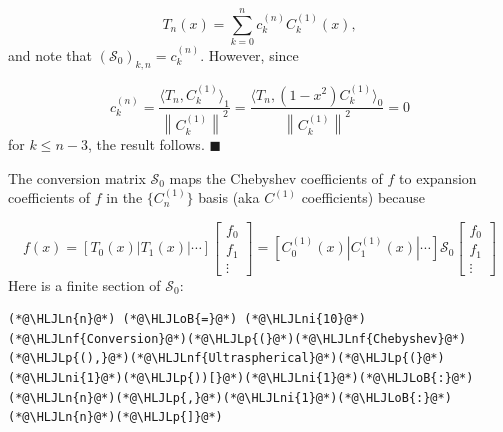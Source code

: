 \documentclass[12pt,a4paper]{article}
\newcommand{\HLJLn}[1]{#1}
\newcommand{\HLJLnf}[1]{\textcolor[RGB]{66,102,213}{#1}}
\newcommand{\HLJLni}[1]{\textcolor[RGB]{59,151,46}{#1}}
\newcommand{\HLJLoB}[1]{\textcolor[RGB]{102,102,102}{\textbf{#1}}}
\newcommand{\HLJLp}[1]{#1}
\begin{document}
\[
T_n(x) = \sum_{k=0}^{n} c_k^{(n)} C_k^{(1)}(x),
\]
and note that $\left(\mathcal{S}_0\right)_{k,n} = c_k^{(n)}$. However, since

\[
c_k^{(n)} = \frac{\langle  T_n,  C^{(1)}_k \rangle_{1}}{\left\| C^{(1)}_k \right\|^2} = \frac{\langle  T_n,  (1-x^2)C^{(1)}_k \rangle_{0}}{\left\| C^{(1)}_k \right\|^2} = 0
\]
for $k \leq n-3$, the result follows.  $\blacksquare$

The conversion matrix $\mathcal{S}_0$ maps the Chebyshev coefficients of $f$ to expansion coefficients of $f$ in the $\{C_n^{(1)}\}$ basis (aka $C^{(1)}$ coefficients) because

\[
f(x) = \left[ T_0(x) | T_1(x) | \cdots  \right]
\begin{bmatrix}
f_0 \\
f_1 \\
\vdots
\end{bmatrix}  =  \left[ C^{(1)}_0(x) | C^{(1)}_1(x) | \cdots  \right]\mathcal{S}_0\begin{bmatrix}
f_0 \\
f_1 \\
\vdots
\end{bmatrix}
\]
Here is a finite section of $\mathcal{S}_0$:


\begin{lstlisting}
(*@\HLJLn{n}@*) (*@\HLJLoB{=}@*) (*@\HLJLni{10}@*)
(*@\HLJLnf{Conversion}@*)(*@\HLJLp{(}@*)(*@\HLJLnf{Chebyshev}@*)(*@\HLJLp{(),}@*)(*@\HLJLnf{Ultraspherical}@*)(*@\HLJLp{(}@*)(*@\HLJLni{1}@*)(*@\HLJLp{))[}@*)(*@\HLJLni{1}@*)(*@\HLJLoB{:}@*)(*@\HLJLn{n}@*)(*@\HLJLp{,}@*)(*@\HLJLni{1}@*)(*@\HLJLoB{:}@*)(*@\HLJLn{n}@*)(*@\HLJLp{]}@*)
\end{lstlisting}
\end{document}
